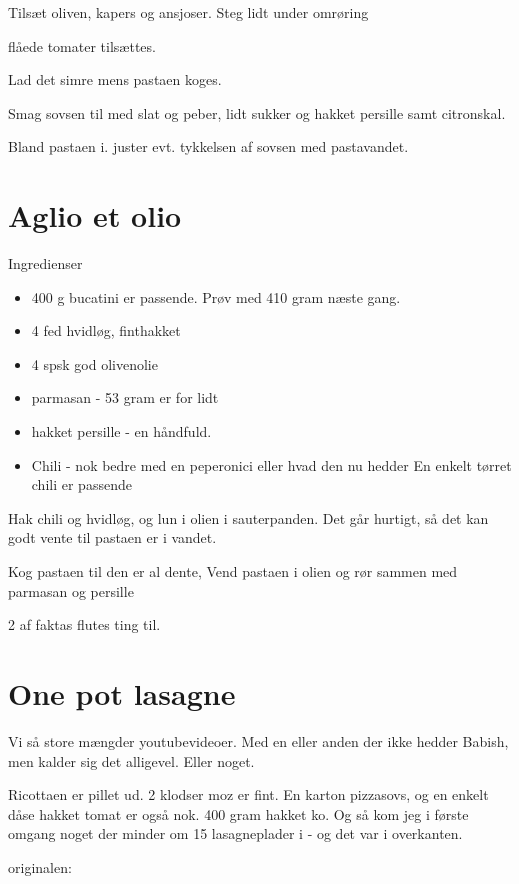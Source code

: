 \documentclass[
]{book}
\providecommand{\tightlist}{%
  \setlength{\itemsep}{0pt}\setlength{\parskip}{0pt}}
\begin{document}
Tilsæt oliven, kapers og ansjoser. Steg lidt under omrøring

flåede tomater tilsættes.

Lad det simre mens pastaen koges.

Smag sovsen til med slat og peber, lidt sukker og hakket persille samt citronskal.

Bland pastaen i. juster evt. tykkelsen af sovsen med pastavandet.

\section{Aglio et olio}\label{aglio-et-olio}

Ingredienser

\begin{itemize}
\tightlist
\item
  400 g bucatini er passende. Prøv med 410 gram næste gang.
\item
  4 fed hvidløg, finthakket
\item
  4 spsk god olivenolie
\item
  parmasan - 53 gram er for lidt
\item
  hakket persille - en håndfuld.
\item
  Chili - nok bedre med en peperonici eller hvad den nu hedder En enkelt tørret chili er passende
\end{itemize}

Hak chili og hvidløg, og lun i olien i sauterpanden. Det går hurtigt, så det kan godt vente til pastaen er i vandet.

Kog pastaen til den er al dente,
Vend pastaen i olien og rør sammen med parmasan og persille

2 af faktas flutes ting til.

\section{One pot lasagne}\label{one-pot-lasagne}

Vi så store mængder youtubevideoer. Med en eller anden der ikke hedder Babish, men kalder sig det alligevel. Eller noget.

Ricottaen er pillet ud. 2 klodser moz er fint. En karton pizzasovs, og en enkelt dåse hakket tomat er også nok.
400 gram hakket ko.
Og så kom jeg i første omgang noget der minder om 15 lasagneplader i - og det var i overkanten.

originalen:
\end{document}
